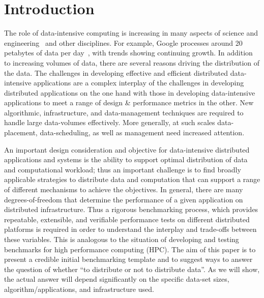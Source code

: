 \documentclass{rspublic}
\begin{document}
\vspace{-0.3cm}

\section{Introduction} 
The role of data-intensive computing is increasing in many aspects of
science and engineering~\citep{fourthparadigm} and other
disciplines. For example, Google processes around 20 petabytes of
data per day~\citep{google}, with trends showing continuing
growth. In addition to increasing volumes of data, there are several
reasons driving the distribution of the data.  The challenges in
developing effective and efficient distributed data-intensive
applications are a complex interplay of the challenges in developing
distributed applications on the one hand with those in developing
data-intensive applications to meet a range of design \& performance
metrics in the other. New algorithmic, infrastructure, and
data-management techniques are required to handle large data-volumes
effectively. More generally, at such scales data-placement,
data-scheduling, as well as management need increased attention.

An important design consideration and objective for data-intensive
distributed applications and systems is the ability to support optimal
distribution of data and computational workload; thus an important
challenge is to find broadly applicable strategies to distribute data
and computation that can support a range of different mechanisms to
achieve the objectives. In general, there are many degrees-of-freedom
that determine the performance of a given application on distributed
infrastructure. Thus a rigorous benchmarking process, which provides
repeatable, extensible, and verifiable performance tests on different
distributed platforms is required in order to understand the interplay
and trade-offs between these variables. This is analogous to the
situation of developing and testing benchmarks for high performance
computing (HPC). The aim of this paper is to present a credible
initial benchmarking template and to suggest ways to answer the
question of whether ``to distribute or not to distribute data''.  As
we will show, the actual answer will depend significantly on the
specific data-set sizes, algorithm/applications, and infrastructure
used.
\end{document}
